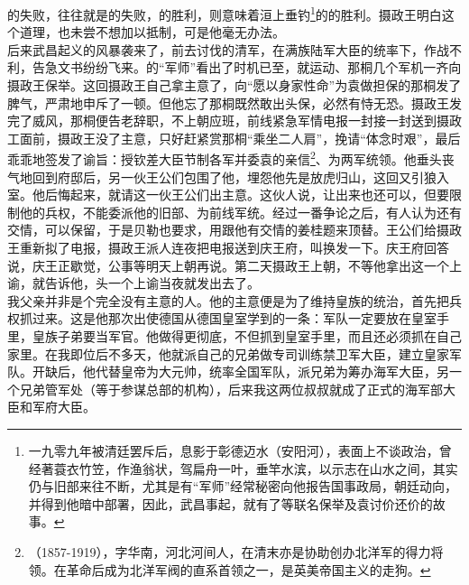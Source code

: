 的失败，往往就是的失败，的胜利，则意味着洹上垂钓\footnote{一九零九年被清廷罢斥后，息影于彰德迈水（安阳河），表面上不谈政治，曾经著蓑衣竹笠，作渔翁状，驾扁舟一叶，垂竿水滨，以示志在山水之间，其实仍与旧部来往不断，尤其是有“军师”经常秘密向他报告国事政局，朝廷动向，并得到他暗中部署，因此，武昌事起，就有了等联名保举及袁讨价还价的故事。}的的胜利。摄政王明白这个道理，也未尝不想加以抵制，可是他毫无办法。\\

后来武昌起义的风暴袭来了，前去讨伐的清军，在满族陆军大臣的统率下，作战不利，告急文书纷纷飞来。的“军师”看出了时机已至，就运动、那桐几个军机一齐向摄政王保举。这回摄政王自己拿主意了，向“愿以身家性命”为袁做担保的那桐发了脾气，严肃地申斥了一顿。但他忘了那桐既然敢出头保，必然有恃无恐。摄政王发完了威风，那桐便告老辞职，不上朝应班，前线紧急军情电报一封接一封送到摄政工面前，摄政王没了主意，只好赶紧赏那桐“乘坐二人肩”，挽请“体念时艰”，最后乖乖地签发了谕旨：授钦差大臣节制各军并委袁的亲信\footnote{（1857-1919），字华南，河北河间人，在清末亦是协助创办北洋军的得力将领。在革命后成为北洋军阀的直系首领之一，是英美帝国主义的走狗。}、为两军统领。他垂头丧气地回到府邸后，另一伙王公们包围了他，埋怨他先是放虎归山，这回又引狼入室。他后悔起来，就请这一伙王公们出主意。这伙人说，让出来也还可以，但要限制他的兵权，不能委派他的旧部、为前线军统。经过一番争论之后，有人认为还有交情，可以保留，于是贝勒也要求，用跟他有交情的姜桂题来顶替。王公们给摄政王重新拟了电报，摄政王派人连夜把电报送到庆王府，叫换发一下。庆王府回答说，庆王正歇觉，公事等明天上朝再说。第二天摄政王上朝，不等他拿出这一个上谕，就告诉他，头一个上谕当夜就发出去了。\\

我父亲并非是个完全没有主意的人。他的主意便是为了维持皇族的统治，首先把兵权抓过来。这是他那次出使德国从德国皇室学到的一条：军队一定要放在皇室手里，皇族子弟要当军官。他做得更彻底，不但抓到皇室手里，而且还必须抓在自己家里。在我即位后不多天，他就派自己的兄弟做专司训练禁卫军大臣，建立皇家军队。开缺后，他代替皇帝为大元帅，统率全国军队，派兄弟为筹办海军大臣，另一个兄弟管军处（等于参谋总部的机构），后来我这两位叔叔就成了正式的海军部大臣和军府大臣。\\

